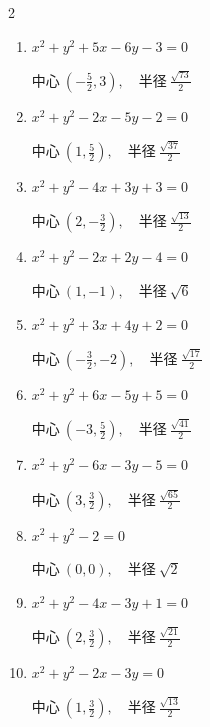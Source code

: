 \begin{multicols}{2}
\begin{enumerate}
        $\displaystyle 中心\: \left(-3,-\frac{1}{2}\right), \quad 半径 \ \frac{\sqrt{21}}{2}$

  \item $x^{2}+y^{2}+5x-6y-3=0$

        $\displaystyle 中心\: \left(-\frac{5}{2},3\right), \quad 半径 \ \frac{\sqrt{73}}{2}$

  \item $x^{2}+y^{2}-2x-5y-2=0$

        $\displaystyle 中心\: \left(1,\frac{5}{2}\right), \quad 半径 \ \frac{\sqrt{37}}{2}$

  \item $x^{2}+y^{2}-4x+3y+3=0$

        $\displaystyle 中心\: \left(2,-\frac{3}{2}\right), \quad 半径 \ \frac{\sqrt{13}}{2}$

  \item $x^{2}+y^{2}-2x+2y-4=0$

        $\displaystyle 中心\: \left(1,-1\right), \quad 半径 \ \sqrt{6}$

  \item $x^{2}+y^{2}+3x+4y+2=0$

        $\displaystyle 中心\: \left(-\frac{3}{2},-2\right), \quad 半径 \ \frac{\sqrt{17}}{2}$

  \item $x^{2}+y^{2}+6x-5y+5=0$

        $\displaystyle 中心\: \left(-3,\frac{5}{2}\right), \quad 半径 \ \frac{\sqrt{41}}{2}$

  \item $x^{2}+y^{2}-6x-3y-5=0$

        $\displaystyle 中心\: \left(3,\frac{3}{2}\right), \quad 半径 \ \frac{\sqrt{65}}{2}$

  \item $x^{2}+y^{2}-2=0$

        $\displaystyle 中心\: \left(0,0\right), \quad 半径 \ \sqrt{2}$

  \item $x^{2}+y^{2}-4x-3y+1=0$

        $\displaystyle 中心\: \left(2,\frac{3}{2}\right), \quad 半径 \ \frac{\sqrt{21}}{2}$

\columnbreak %

  \item $x^{2}+y^{2}-2x-3y=0$

        $\displaystyle 中心\: \left(1,\frac{3}{2}\right), \quad 半径 \ \frac{\sqrt{13}}{2}$


\end{enumerate}
\end{multicols}

